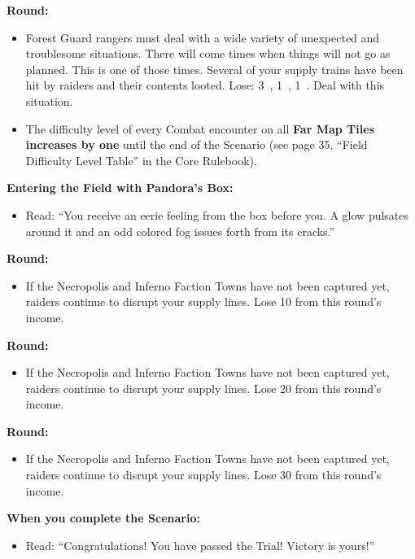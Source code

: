 \begin{multicols*}{2}
\textbf{ Round:}
\begin{itemize}
  \item Forest Guard rangers must deal with a wide variety of unexpected and troublesome situations.
    There will come times when things will not go as planned.
    This is one of those times.
    Several of your supply trains have been hit by raiders and their contents looted.
    Lose: 3~, 1~, 1~.
    Deal with this situation.
  \item The difficulty level of every Combat encounter on all \textbf{Far Map Tiles increases by one} until the end of the Scenario (see page 35, ``Field Difficulty Level Table'' in the Core Rulebook).
\end{itemize}

\textbf{Entering the Field with Pandora's Box:}
\begin{itemize}
  \item Read: ``You receive an eerie feeling from the box before you.
    A glow pulsates around it and an odd colored fog issues forth from its cracks.''
\end{itemize}

\textbf{ Round:}
\begin{itemize}
 \item If the Necropolis and Inferno Faction Towns have not been captured yet, raiders continue to disrupt your supply lines.
   Lose 10  from this round's income.
\end{itemize}

\textbf{ Round:}
\begin{itemize}
  \item If the Necropolis and Inferno Faction Towns have not been captured yet, raiders continue to disrupt your supply lines.
    Lose 20  from this round's income.
\end{itemize}

\textbf{ Round:}
\begin{itemize}
  \item If the Necropolis and Inferno Faction Towns have not been captured yet, raiders continue to disrupt your supply lines.
    Lose 30  from this round's income.
\end{itemize}

\textbf{When you complete the Scenario:}
\begin{itemize}
  \item Read: ``Congratulations! You have passed the Trial! Victory is yours!''
\end{itemize}



\end{multicols*}
